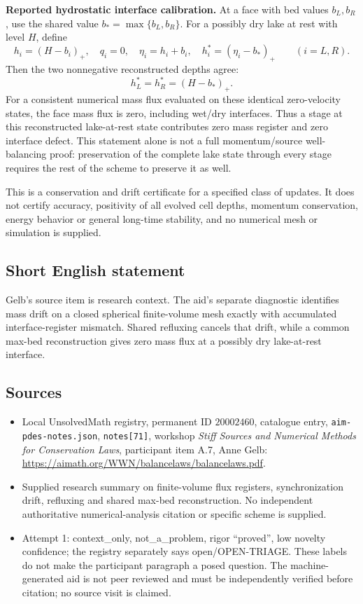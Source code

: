 \documentclass[11pt]{article}
\begin{document}
\textbf{Reported hydrostatic interface calibration.} At a face with bed values \(b_L,b_R\), use the shared value \(b_*=\max\{b_L,b_R\}\). For a possibly dry lake at rest with level \(H\), define
\[
 h_i=(H-b_i)_+,\quad q_i=0,\quad \eta_i=h_i+b_i,\quad
 h_i^*=(\eta_i-b_*)_+\qquad(i=L,R).
\]
Then the two nonnegative reconstructed depths agree:
\[
 h_L^*=h_R^*=(H-b_*)_+.
\]
For a consistent numerical mass flux evaluated on these identical zero-velocity states, the face mass flux is zero, including wet/dry interfaces. Thus a stage at this reconstructed lake-at-rest state contributes zero mass register and zero interface defect. This statement alone is not a full momentum/source well-balancing proof: preservation of the complete lake state through every stage requires the rest of the scheme to preserve it as well.

This is a conservation and drift certificate for a specified class of updates. It does not certify accuracy, positivity of all evolved cell depths, momentum conservation, energy behavior or general long-time stability, and no numerical mesh or simulation is supplied.
\subsection{Short English statement}
Gelb's source item is research context. The aid's separate diagnostic identifies mass drift on a closed spherical finite-volume mesh exactly with accumulated interface-register mismatch. Shared refluxing cancels that drift, while a common max-bed reconstruction gives zero mass flux at a possibly dry lake-at-rest interface.
\subsection{Sources}
\begin{itemize}
\item Local UnsolvedMath registry, permanent ID \(20002460\), catalogue entry, \texttt{aim-pdes-notes.json}, \texttt{notes[71]}, workshop \emph{Stiff Sources and Numerical Methods for Conservation Laws}, participant item A.7, Anne Gelb: \url{https://aimath.org/WWN/balancelaws/balancelaws.pdf}.
\item Supplied research summary on finite-volume flux registers, synchronization drift, refluxing and shared max-bed reconstruction. No independent authoritative numerical-analysis citation or specific scheme is supplied.
\item Attempt 1: context\_only, not\_a\_problem, rigor ``proved'', low novelty confidence; the registry separately says open/OPEN-TRIAGE. These labels do not make the participant paragraph a posed question. The machine-generated aid is not peer reviewed and must be independently verified before citation; no source visit is claimed.
\end{itemize}
\end{document}
